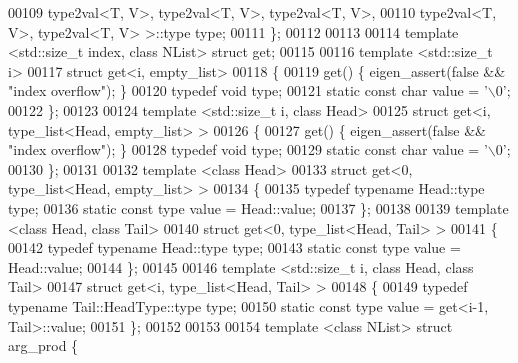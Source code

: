 \begin{DoxyCode}
00109                                   type2val<T, V>, type2val<T, V>, type2val<T, V>,
00110                                   type2val<T, V>, type2val<T, V> >::type type;
00111 \};
00112 
00113 
00114 \textcolor{keyword}{template} <std::\textcolor{keywordtype}{size\_t} index, \textcolor{keyword}{class} NList> \textcolor{keyword}{struct }get;
00115 
00116 \textcolor{keyword}{template} <std::\textcolor{keywordtype}{size\_t} i>
00117 \textcolor{keyword}{struct }get<i, empty\_list>
00118 \{
00119   \textcolor{keyword}{get}() \{ eigen\_assert(\textcolor{keyword}{false} && \textcolor{stringliteral}{"index overflow"}); \}
00120   \textcolor{keyword}{typedef} \textcolor{keywordtype}{void} type;
00121   \textcolor{keyword}{static} \textcolor{keyword}{const} \textcolor{keywordtype}{char} value = \textcolor{charliteral}{'\(\backslash\)0'};
00122 \};
00123 
00124 \textcolor{keyword}{template} <std::\textcolor{keywordtype}{size\_t} i, \textcolor{keyword}{class} Head>
00125 \textcolor{keyword}{struct }get<i, type\_list<Head, empty\_list> >
00126 \{
00127   \textcolor{keyword}{get}() \{ eigen\_assert(\textcolor{keyword}{false} && \textcolor{stringliteral}{"index overflow"}); \}
00128   \textcolor{keyword}{typedef} \textcolor{keywordtype}{void} type;
00129   \textcolor{keyword}{static} \textcolor{keyword}{const} \textcolor{keywordtype}{char} value = \textcolor{charliteral}{'\(\backslash\)0'};
00130 \};
00131 
00132 \textcolor{keyword}{template} <\textcolor{keyword}{class} Head>
00133 \textcolor{keyword}{struct }get<0, type\_list<Head, empty\_list> >
00134 \{
00135   \textcolor{keyword}{typedef} \textcolor{keyword}{typename} Head::type type;
00136   \textcolor{keyword}{static} \textcolor{keyword}{const} type value = Head::value;
00137 \};
00138 
00139 \textcolor{keyword}{template} <\textcolor{keyword}{class} Head, \textcolor{keyword}{class} Tail>
00140 \textcolor{keyword}{struct }get<0, type\_list<Head, Tail> >
00141 \{
00142   \textcolor{keyword}{typedef} \textcolor{keyword}{typename} Head::type type;
00143   \textcolor{keyword}{static} \textcolor{keyword}{const} type value = Head::value;
00144 \};
00145 
00146 \textcolor{keyword}{template} <std::\textcolor{keywordtype}{size\_t} i, \textcolor{keyword}{class} Head, \textcolor{keyword}{class} Tail>
00147 \textcolor{keyword}{struct }get<i, type\_list<Head, Tail> >
00148 \{
00149   \textcolor{keyword}{typedef} \textcolor{keyword}{typename} Tail::HeadType::type type;
00150   \textcolor{keyword}{static} \textcolor{keyword}{const} type value = \textcolor{keyword}{get}<i-1, Tail>::value;
00151 \};
00152 
00153 
00154 \textcolor{keyword}{template} <\textcolor{keyword}{class} NList> \textcolor{keyword}{struct }arg\_prod \{

\end{DoxyCode}
